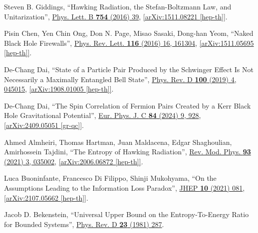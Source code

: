 \documentclass[preprintnumbers, floatfix, preprintnumbers, letterpaper, twocolumn, superscriptaddress,nofootinbib]{revtex4-2}
\begin{document}
\begin{thebibliography}{99}
Steven B. Giddings, ``Hawking Radiation, the Stefan-Boltzmann Law, and Unitarization'', {\hypersetup{urlcolor=vividviolet}\href{https://www.sciencedirect.com/science/article/pii/S0370269316000022?via\%3Dihub}{Phys. Lett. B \textbf{754} (2016) 39}}, \href{https://arxiv.org/abs/1511.08221}{[arXiv:1511.08221 [hep-th]]}.

Pisin Chen, Yen Chin Ong, Don N. Page, Misao Sasaki, Dong-han Yeom, ``Naked Black Hole Firewalls'', {\hypersetup{urlcolor=vividviolet}\href{https://journals.aps.org/prl/abstract/10.1103/PhysRevLett.116.161304}{Phys. Rev. Lett. \textbf{116} (2016) 16, 161304}}, \href{https://arxiv.org/abs/1511.05695}{[arXiv:1511.05695 [hep-th]]}.

De-Chang Dai, ``State of a Particle Pair Produced by the Schwinger Effect Is Not Necessarily a Maximally Entangled Bell State'', {\hypersetup{urlcolor=vividviolet}\href{https://journals.aps.org/prd/abstract/10.1103/PhysRevD.100.045015}{Phys. Rev. D \textbf{100} (2019) 4, 045015}}, \href{https://arxiv.org/abs/1908.01005}{[arXiv:1908.01005 [hep-th]]}.

De-Chang Dai, ``The Spin Correlation of Fermion Pairs Created by a Kerr Black Hole Gravitational Potential'', {\hypersetup{urlcolor=vividviolet}\href{https://link.springer.com/article/10.1140/epjc/s10052-024-13288-2}{Eur. Phys. J. C \textbf{84} (2024) 9, 928}}, \href{https://arxiv.org/abs/2409.05051}{[arXiv:2409.05051 [gr-qc]]}.


Ahmed Almheiri, Thomas Hartman, Juan Maldacena, Edgar Shaghoulian, Amirhossein Tajdini, ``The Entropy of Hawking Radiation'', {\hypersetup{urlcolor=vividviolet}\href{https://journals.aps.org/rmp/abstract/10.1103/RevModPhys.93.035002}{Rev. Mod. Phys. \textbf{93} (2021) 3, 035002}}, \href{https://arxiv.org/abs/2006.06872}{[arXiv:2006.06872 [hep-th]]}.

Luca Buoninfante, Francesco Di Filippo, Shinji Mukohyama, ``On the Assumptions Leading to the Information Loss Paradox'', {\hypersetup{urlcolor=vividviolet}\href{https://doi.org/10.1007/JHEP10(2021)081}{JHEP \textbf{10} (2021) 081}}, \href{https://arxiv.org/abs/2107.05662}{[arXiv:2107.05662 [hep-th]]}.

Jacob D. Bekenstein, ``Universal Upper Bound on the Entropy-To-Energy Ratio for Bounded Systems'', {\hypersetup{urlcolor=vividviolet}\href{https://journals.aps.org/prd/abstract/10.1103/PhysRevD.23.287}{Phys. Rev. D \textbf{23} (1981) 287}}.


\end{thebibliography}
\end{document}
